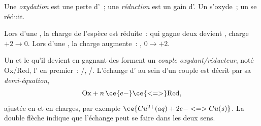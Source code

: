 \begin{definition}\label{def:g11:redox:oxidation}
Une \emph{oxydation} est une perte d'~; une
\emph{réduction} est un gain d'. Un 
s'oxyde~; un  se réduit.
\end{definition}

\begin{remark}\label{rem:g11:redox:remember}
Lors d'une \emph{}, la charge de l'espèce est réduite~:
 qui gagne deux  devient , charge $+2 \to 0$.
Lors d'une , la charge augmente~: ,
$0 \to +2$.
\end{remark}

\begin{definition}\label{def:g11:redox:couple}
Un  et le  qu'il devient en gagnant des  forment
un \emph{couple oxydant/réducteur}, noté
Ox/Red, l' en premier~: /,
/. L'échange d' au sein d'un couple est
décrit par sa \emph{demi-équation},
\[
  \text{Ox} + n\,\ce{e-} \ce{<=>} \text{Red}, %
\]
ajustée en  et en charges, par exemple
$\ce{Cu^{2+}(aq) + 2e- <=> Cu(s)}$. La double flèche indique que
l'échange peut se faire dans les deux sens.
\end{definition}

